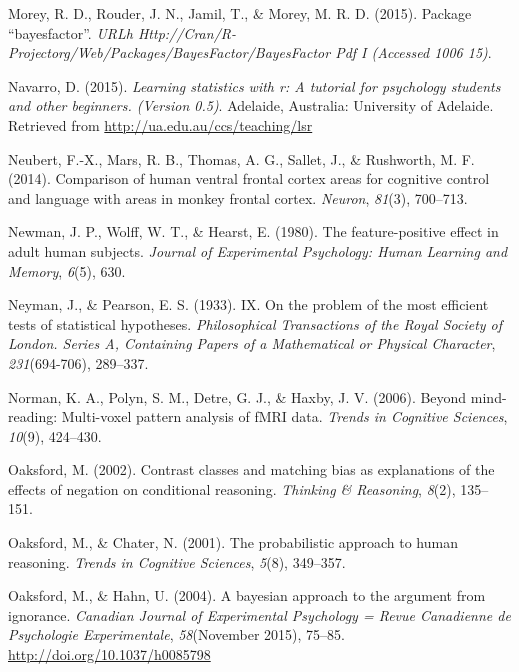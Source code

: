 \documentclass[12pt,twoside]{reedthesis}
\begin{document}
\leavevmode\hypertarget{ref-morey2015package}{}%
Morey, R. D., Rouder, J. N., Jamil, T., \& Morey, M. R. D. (2015). Package ``bayesfactor''. \emph{URLh Http://Cran/R-Projectorg/Web/Packages/BayesFactor/BayesFactor Pdf I (Accessed 1006 15)}.

\leavevmode\hypertarget{ref-R-lsr}{}%
Navarro, D. (2015). \emph{Learning statistics with r: A tutorial for psychology students and other beginners. (Version 0.5)}. Adelaide, Australia: University of Adelaide. Retrieved from \url{http://ua.edu.au/ccs/teaching/lsr}

\leavevmode\hypertarget{ref-neubert2014comparison}{}%
Neubert, F.-X., Mars, R. B., Thomas, A. G., Sallet, J., \& Rushworth, M. F. (2014). Comparison of human ventral frontal cortex areas for cognitive control and language with areas in monkey frontal cortex. \emph{Neuron}, \emph{81}(3), 700--713.

\leavevmode\hypertarget{ref-newman1980feature}{}%
Newman, J. P., Wolff, W. T., \& Hearst, E. (1980). The feature-positive effect in adult human subjects. \emph{Journal of Experimental Psychology: Human Learning and Memory}, \emph{6}(5), 630.

\leavevmode\hypertarget{ref-neyman1933ix}{}%
Neyman, J., \& Pearson, E. S. (1933). IX. On the problem of the most efficient tests of statistical hypotheses. \emph{Philosophical Transactions of the Royal Society of London. Series A, Containing Papers of a Mathematical or Physical Character}, \emph{231}(694-706), 289--337.

\leavevmode\hypertarget{ref-norman2006beyond}{}%
Norman, K. A., Polyn, S. M., Detre, G. J., \& Haxby, J. V. (2006). Beyond mind-reading: Multi-voxel pattern analysis of fMRI data. \emph{Trends in Cognitive Sciences}, \emph{10}(9), 424--430.

\leavevmode\hypertarget{ref-oaksford2002contrast}{}%
Oaksford, M. (2002). Contrast classes and matching bias as explanations of the effects of negation on conditional reasoning. \emph{Thinking \& Reasoning}, \emph{8}(2), 135--151.

\leavevmode\hypertarget{ref-oaksford2001probabilistic}{}%
Oaksford, M., \& Chater, N. (2001). The probabilistic approach to human reasoning. \emph{Trends in Cognitive Sciences}, \emph{5}(8), 349--357.

\leavevmode\hypertarget{ref-Oaksford2004}{}%
Oaksford, M., \& Hahn, U. (2004). A bayesian approach to the argument from ignorance. \emph{Canadian Journal of Experimental Psychology = Revue Canadienne de Psychologie Experimentale}, \emph{58}(November 2015), 75--85. \url{http://doi.org/10.1037/h0085798}
\end{document}
